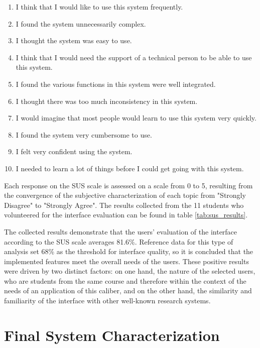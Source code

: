 \documentclass[sigconf]{acmart}
\begin{document}
\begin{enumerate}

    \renewcommand{\labelenumi}{\arabic{enumi}.}
    \item I think that I would like to use this system frequently.
    \item I found the system unnecessarily complex.
    \item I thought the system was easy to use.
    \item I think that I would need the support of a technical person to be able to use this system.
    \item I found the various functions in this system were well integrated.
    \item I thought there was too much inconsistency in this system.
    \item I would imagine that most people would learn to use this system very quickly.
    \item I found the system very cumbersome to use.
    \item I felt very confident using the system.
    \item I needed to learn a lot of things before I could get going with this system.
\end{enumerate}


Each response on the SUS scale is assessed on a scale from 0 to 5, resulting from the convergence of the subjective characterization of each topic from "Strongly Disagree" to "Strongly Agree". The results collected from the 11 students who volunteered for the interface evaluation can be found in table \ref{tab:sus_results}.

The collected results demonstrate that the users' evaluation of the interface according to the SUS scale averages 81.6\%. Reference data for this type of analysis set 68\% as the threshold for interface quality, so it is concluded that the implemented features meet the overall needs of the users. These positive results were driven by two distinct factors: on one hand, the nature of the selected users, who are students from the same course and therefore within the context of the needs of an application of this caliber, and on the other hand, the similarity and familiarity of the interface with other well-known research systems.

\section{Final System Characterization}
\end{document}
